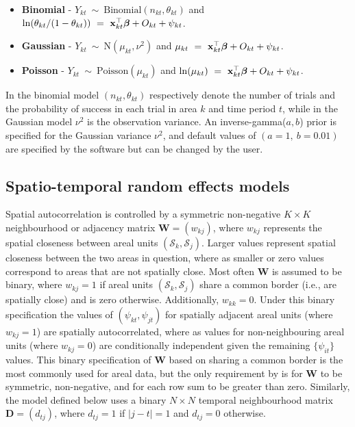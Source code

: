\documentclass[article, nojss]{jss}
\newcommand{\bd}[1]{\ensuremath{\mbox{\boldmath $#1$}}}
\begin{document}
\begin{itemize}
\item \textbf{Binomial} -  $Y_{kt}~\sim~\mbox{Binomial}(n_{kt}, \theta_{kt})$ and $\ln(\theta_{kt}/(1-\theta_{kt}))~=~\mathbf{x}_{kt}^{\top}\bd{\beta} + O_{kt} + \psi_{kt}$. 

\item \textbf{Gaussian} -  $Y_{kt}~\sim~\mbox{N}(\mu_{kt}, \nu^{2})$ and $\mu_{kt}~=~\mathbf{x}_{kt}^{\top}\bd{\beta} + O_{kt} + \psi_{kt}$. 

\item \textbf{Poisson} -  $Y_{kt}~\sim~\mbox{Poisson}(\mu_{kt})$ and $\ln(\mu_{kt})~=~\mathbf{x}_{kt}^{\top}\bd{\beta} + O_{kt} + \psi_{kt}$. 
\end{itemize}

In the binomial model $(n_{kt}, \theta_{kt})$ respectively denote the number of trials and the probability of success in each trial in area $k$ and time period $t$, while in the Gaussian model $\nu^2$ is the observation variance. An inverse-gamma($a,b$) prior is specified for the Gaussian variance $\nu^2$, and default values of $(a=1,~ b=0.01)$  are specified by the software but can be changed by the user.


\subsection{Spatio-temporal random effects models}\label{section2.2}
Spatial autocorrelation is controlled by a symmetric non-negative $K\times K$ neighbourhood or adjacency matrix $\mathbf{W}=(w_{kj})$, where $w_{kj}$ represents the spatial closeness between areal units $(\mathcal{S}_k, \mathcal{S}_j)$. Larger values represent spatial closeness between the two areas in question, where as smaller or zero values correspond to areas that are not spatially close. Most often $\mathbf{W}$ is assumed to be binary, where $w_{kj}=1$ if areal units $(\mathcal{S}_k, \mathcal{S}_j)$ share a common border (i.e., are spatially close) and is zero otherwise. Additionally, $w_{kk}=0$. Under this binary specification the values of $(\psi_{kt}, \psi_{jt})$ for spatially adjacent areal units (where $w_{kj}=1$) are spatially autocorrelated, where as values for non-neighbouring areal units (where $w_{kj}=0$) are conditionally independent given the remaining $\{\psi_{it}\}$ values. This binary specification of $\mathbf{W}$ based on sharing a common border is the most commonly used for areal data, but the only requirement by  is for $\mathbf{W}$ to be symmetric, non-negative, and for each row sum to be greater than zero. Similarly, the model  defined below uses a binary $N\times N$ temporal neighbourhood matrix $\mathbf{D}=(d_{tj})$, where $d_{tj}=1$ if $|j-t|=1$ and $d_{tj}=0$ otherwise.\\ 
\end{document}
